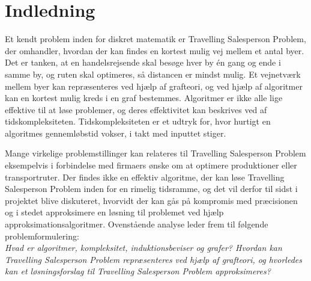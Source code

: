 \chapter{Indledning}
Et kendt problem inden for diskret matematik er Travelling Salesperson Problem, der omhandler, hvordan der kan findes en kortest mulig vej mellem et antal byer. 
Det er tanken, at en handelsrejsende skal besøge hver by én gang og ende i samme by, og ruten skal optimeres, så distancen er mindst mulig. 
Et vejnetværk mellem byer kan repræsenteres ved hjælp af grafteori, og ved hjælp af algoritmer kan en kortest mulig kreds i en graf bestemmes. 
Algoritmer er ikke alle lige effektive til at løse problemer, og deres effektivitet kan beskrives ved af tidskompleksiteten. 
Tidskompleksiteten er et udtryk for, hvor hurtigt en algoritmes gennemløbstid vokser, i takt med inputtet stiger. 

Mange virkelige problemstillinger kan relateres til Travelling Salesperson Problem eksempelvis i forbindelse med firmaers ønske om at optimere produktioner eller transportruter. 
Der findes ikke en effektiv algoritme, der kan løse Travelling Salesperson Problem inden for en rimelig tidsramme, og det vil derfor til sidst i projektet blive diskuteret, hvorvidt der kan gås på kompromis med præcisionen og i stedet approksimere en løsning til problemet ved hjælp approksimationsalgoritmer.
Ovenstående analyse leder frem til følgende problemformulering:\\

\textit{Hvad er algoritmer, kompleksitet, induktionsbeviser og grafer? Hvordan kan Travelling Salesperson Problem repræsenteres ved hjælp af grafteori, og hvorledes kan et løsningsforslag til Travelling Salesperson Problem approksimeres?}
\\\\

